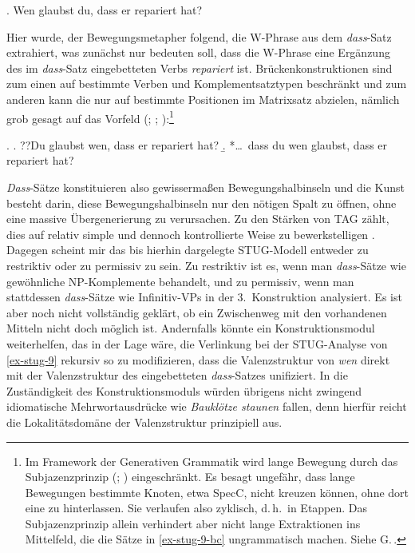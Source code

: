 \ex. \label{ex-stug-9} Wen glaubst du, dass er repariert hat?

Hier wurde, der Bewegungsmetapher folgend, die W-Phrase aus dem \textit{dass}-Satz extrahiert, was zunächst nur bedeuten soll, dass die W-Phrase eine Ergänzung des im \emph{dass}-Satz eingebetteten Verbs {\it repariert} ist. Brückenkonstruktionen sind zum einen auf bestimmte Verben und Komplementsatztypen beschränkt und zum anderen kann die  nur auf bestimmte Positionen im Matrixsatz abzielen, nämlich grob gesagt auf das Vorfeld (\citealt[Abschnitt~4.2.1.2]{Kvam:83}; \citealt{Luehr:88}; \citealt[Abschnitt~1.2]{Lutz:04}):\footnote{Im Framework der Generativen Grammatik wird lange Bewegung durch das Subjazenzprinzip (\citealt{Chomsky:73}; \citealt[Chapter~6]{Chomsky:86}) eingeschränkt. Es besagt ungefähr, dass lange Bewegungen bestimmte Knoten, etwa SpecC, nicht kreuzen können, ohne dort eine  zu hinterlassen. Sie verlaufen also zyklisch, d.\,h.\ in Etappen. Das Subjazenzprinzip allein verhindert aber nicht lange Extraktionen ins Mittelfeld, die die Sätze in \ref{ex-stug-9-bc} ungrammatisch machen. Siehe G.\,\cite{Mueller:Sternefeld:93}.}

\ex. \label{ex-stug-9-bc}
\a. ??Du glaubst wen, dass er repariert hat?\label{ex-stug-9-b} 
\b. *\ldots\ dass du wen glaubst, dass er repariert hat?\label{ex-stug-9-c} 

\textit{Dass}-Sätze konstituieren also gewissermaßen Bewegungshalbinseln und die Kunst besteht darin, diese Bewegungshalbinseln nur den nötigen Spalt zu öffnen, ohne eine massive Übergenerierung zu verursachen. Zu den Stärken von TAG zählt, dies auf relativ simple und dennoch kontrollierte Weise zu bewerkstelligen \citep{Kroch:89,Frank:06}. Dagegen scheint mir das bis hierhin dargelegte STUG-Modell entweder zu restriktiv oder zu permissiv zu sein. Zu restriktiv ist es, wenn man \textit{dass}-Sätze wie gewöhnliche NP-Komplemente behandelt, und zu permissiv, wenn man stattdessen \textit{dass}-Sätze wie Infinitiv-VPs in der 3.~Konstruktion analysiert. Es ist aber noch nicht vollständig geklärt, ob ein Zwischenweg mit den vorhandenen Mitteln nicht doch möglich ist. Andernfalls könnte ein Konstruktionsmodul weiterhelfen, das in der Lage wäre, die Verlinkung bei der STUG-Analyse von \ref{ex-stug-9} rekursiv so zu modifizieren, dass die Valenzstruktur von {\it wen} direkt mit der Valenzstruktur des eingebetteten \emph{dass}-Satzes unifiziert. In die Zuständigkeit des Konstruktionsmoduls würden übrigens nicht zwingend idiomatische Mehrwortausdrücke wie {\it Bauklötze staunen} fallen, denn hierfür reicht die Lokalitätsdomäne der Valenzstruktur prinzipiell aus.


